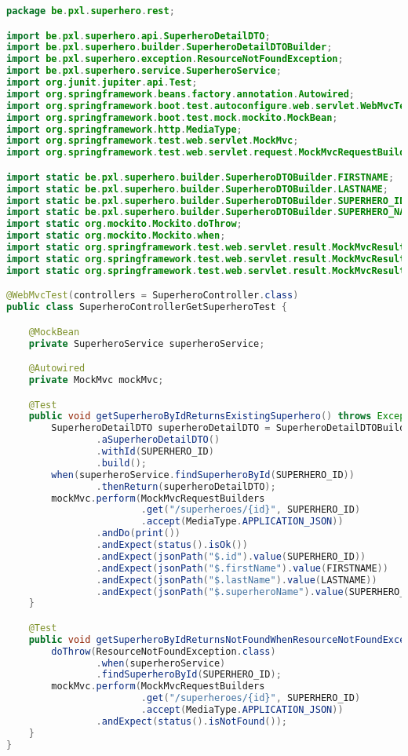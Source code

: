 \begin{lstlisting}[language=java, frame=single]
package be.pxl.superhero.rest;

import be.pxl.superhero.api.SuperheroDetailDTO;
import be.pxl.superhero.builder.SuperheroDetailDTOBuilder;
import be.pxl.superhero.exception.ResourceNotFoundException;
import be.pxl.superhero.service.SuperheroService;
import org.junit.jupiter.api.Test;
import org.springframework.beans.factory.annotation.Autowired;
import org.springframework.boot.test.autoconfigure.web.servlet.WebMvcTest;
import org.springframework.boot.test.mock.mockito.MockBean;
import org.springframework.http.MediaType;
import org.springframework.test.web.servlet.MockMvc;
import org.springframework.test.web.servlet.request.MockMvcRequestBuilders;

import static be.pxl.superhero.builder.SuperheroDTOBuilder.FIRSTNAME;
import static be.pxl.superhero.builder.SuperheroDTOBuilder.LASTNAME;
import static be.pxl.superhero.builder.SuperheroDTOBuilder.SUPERHERO_ID;
import static be.pxl.superhero.builder.SuperheroDTOBuilder.SUPERHERO_NAME;
import static org.mockito.Mockito.doThrow;
import static org.mockito.Mockito.when;
import static org.springframework.test.web.servlet.result.MockMvcResultHandlers.print;
import static org.springframework.test.web.servlet.result.MockMvcResultMatchers.jsonPath;
import static org.springframework.test.web.servlet.result.MockMvcResultMatchers.status;

@WebMvcTest(controllers = SuperheroController.class)
public class SuperheroControllerGetSuperheroTest {

	@MockBean
	private SuperheroService superheroService;

	@Autowired
	private MockMvc mockMvc;

	@Test
	public void getSuperheroByIdReturnsExistingSuperhero() throws Exception {
		SuperheroDetailDTO superheroDetailDTO = SuperheroDetailDTOBuilder
				.aSuperheroDetailDTO()
				.withId(SUPERHERO_ID)
				.build();
		when(superheroService.findSuperheroById(SUPERHERO_ID))
				.thenReturn(superheroDetailDTO);
		mockMvc.perform(MockMvcRequestBuilders
						.get("/superheroes/{id}", SUPERHERO_ID)
						.accept(MediaType.APPLICATION_JSON))
				.andDo(print())
				.andExpect(status().isOk())
				.andExpect(jsonPath("$.id").value(SUPERHERO_ID))
				.andExpect(jsonPath("$.firstName").value(FIRSTNAME))
				.andExpect(jsonPath("$.lastName").value(LASTNAME))
				.andExpect(jsonPath("$.superheroName").value(SUPERHERO_NAME));
	}

	@Test
	public void getSuperheroByIdReturnsNotFoundWhenResourceNotFoundExceptionIsThrown() throws Exception {
		doThrow(ResourceNotFoundException.class)
				.when(superheroService)
				.findSuperheroById(SUPERHERO_ID);
		mockMvc.perform(MockMvcRequestBuilders
						.get("/superheroes/{id}", SUPERHERO_ID)
						.accept(MediaType.APPLICATION_JSON))
				.andExpect(status().isNotFound());
	}
}

\end{lstlisting}


